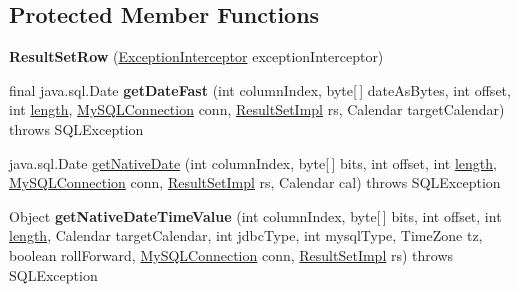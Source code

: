 \subsection*{Protected Member Functions}
\begin{DoxyCompactItemize}
\item 
\mbox{\label{classcom_1_1mysql_1_1jdbc_1_1_result_set_row_a8e4b451a4f91cddb07232bdaa93af00e}} 
{\bfseries Result\+Set\+Row} (\mbox{\hyperlink{interfacecom_1_1mysql_1_1jdbc_1_1_exception_interceptor}{Exception\+Interceptor}} exception\+Interceptor)
\item 
\mbox{\label{classcom_1_1mysql_1_1jdbc_1_1_result_set_row_a51f0c454746c83c422e72e156d44eb3f}} 
final java.\+sql.\+Date {\bfseries get\+Date\+Fast} (int column\+Index, byte\mbox{[}$\,$\mbox{]} date\+As\+Bytes, int offset, int \mbox{\hyperlink{classcom_1_1mysql_1_1jdbc_1_1_result_set_row_a7d2e1a3d54533e0655afdc0a411808ed}{length}}, \mbox{\hyperlink{interfacecom_1_1mysql_1_1jdbc_1_1_my_s_q_l_connection}{My\+S\+Q\+L\+Connection}} conn, \mbox{\hyperlink{classcom_1_1mysql_1_1jdbc_1_1_result_set_impl}{Result\+Set\+Impl}} rs, Calendar target\+Calendar)  throws S\+Q\+L\+Exception 
\item 
java.\+sql.\+Date \mbox{\hyperlink{classcom_1_1mysql_1_1jdbc_1_1_result_set_row_a341f6e94b4b79858e732cc6dc8bfc452}{get\+Native\+Date}} (int column\+Index, byte\mbox{[}$\,$\mbox{]} bits, int offset, int \mbox{\hyperlink{classcom_1_1mysql_1_1jdbc_1_1_result_set_row_a7d2e1a3d54533e0655afdc0a411808ed}{length}}, \mbox{\hyperlink{interfacecom_1_1mysql_1_1jdbc_1_1_my_s_q_l_connection}{My\+S\+Q\+L\+Connection}} conn, \mbox{\hyperlink{classcom_1_1mysql_1_1jdbc_1_1_result_set_impl}{Result\+Set\+Impl}} rs, Calendar cal)  throws S\+Q\+L\+Exception 
\item 
\mbox{\label{classcom_1_1mysql_1_1jdbc_1_1_result_set_row_a7bf648b240228eaa4b571a9388ddc331}} 
Object {\bfseries get\+Native\+Date\+Time\+Value} (int column\+Index, byte\mbox{[}$\,$\mbox{]} bits, int offset, int \mbox{\hyperlink{classcom_1_1mysql_1_1jdbc_1_1_result_set_row_a7d2e1a3d54533e0655afdc0a411808ed}{length}}, Calendar target\+Calendar, int jdbc\+Type, int mysql\+Type, Time\+Zone tz, boolean roll\+Forward, \mbox{\hyperlink{interfacecom_1_1mysql_1_1jdbc_1_1_my_s_q_l_connection}{My\+S\+Q\+L\+Connection}} conn, \mbox{\hyperlink{classcom_1_1mysql_1_1jdbc_1_1_result_set_impl}{Result\+Set\+Impl}} rs)  throws S\+Q\+L\+Exception 

\end{DoxyCompactItemize}
